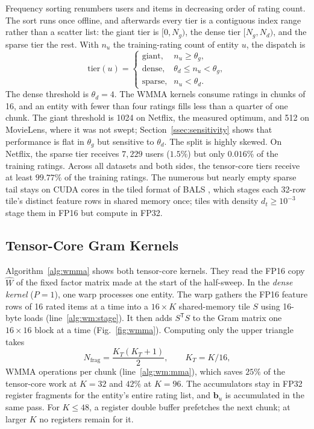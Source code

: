 Frequency sorting renumbers users and items in decreasing order of rating count. The sort runs once offline, and afterwards every tier is a contiguous index range rather than a scatter list: the giant tier is $[0, N_g)$, the dense tier $[N_g, N_d)$, and the sparse tier the rest. With $n_u$ the training-rating count of entity $u$, the dispatch is
\begin{equation}
\text{tier}(u) =
\begin{cases}
\text{giant}, & n_u \ge \theta_g, \\
\text{dense}, & \theta_d \le n_u < \theta_g, \\
\text{sparse}, & n_u < \theta_d .
\end{cases}
\label{eq:tier_def}
\end{equation}
The dense threshold is $\theta_d = 4$. The WMMA kernels consume ratings in chunks of 16, and an entity with fewer than four ratings fills less than a quarter of one chunk. The giant threshold is 1024 on Netflix, the measured optimum, and 512 on MovieLens, where it was not swept; Section~\ref{ssec:sensitivity} shows that performance is flat in $\theta_g$ but sensitive to $\theta_d$.
The split is highly skewed. On Netflix, the sparse tier receives $7{,}229$ users ($1.5\%$) but only $0.016\%$ of the training ratings. Across all datasets and both sides, the tensor-core tiers receive at least $99.77\%$ of the training ratings. The numerous but nearly empty sparse tail stays on CUDA cores in the tiled format of BALS \cite{chen2021bals}, which stages each 32-row tile's distinct feature rows in shared memory once; tiles with density $d_t \ge 10^{-3}$ stage them in FP16 but compute in FP32.

\subsection{Tensor-Core Gram Kernels}
\label{ssec:wmma}

Algorithm~\ref{alg:wmma} shows both tensor-core kernels. They read the FP16 copy $\widehat{W}$ of the fixed factor matrix made at the start of the half-sweep. In the \textit{dense kernel} ($P=1$), one warp processes one entity. The warp gathers the FP16 feature rows of 16 rated items at a time into a $16 \times K$ shared-memory tile $S$ using 16-byte loads (line~\ref{alg:wm:stage}). It then adds $S^{\mathsf{T}} S$ to the Gram matrix one $16 \times 16$ block at a time (Fig.~\ref{fig:wmma}). Computing only the upper triangle takes
\begin{equation}
N_{\text{frag}} = \frac{K_T (K_T + 1)}{2}, \qquad K_T = K/16,
\label{eq:frag_count}
\end{equation}
WMMA operations per chunk (line~\ref{alg:wm:mma}), which saves $25\%$ of the tensor-core work at $K=32$ and $42\%$ at $K=96$. The accumulators stay in FP32 register fragments for the entity's entire rating list, and $\mathbf{b}_u$ is accumulated in the same pass. For $K \le 48$, a register double buffer prefetches the next chunk; at larger $K$ no registers remain for it.

